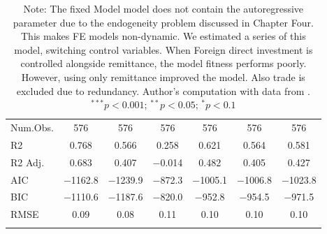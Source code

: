 \begin{longtable}{@{\extracolsep{-3pt}}lcccccc}
Num.Obs. & \num{576} & \num{576} & \num{576} & \num{576} & \num{576} & \num{576}\\
R2 & \num{0.768} & \num{0.566} & \num{0.258} & \num{0.621} & \num{0.564} & \num{0.581}\\
R2 Adj. & \num{0.683} & \num{0.407} & \num{-0.014} & \num{0.482} & \num{0.405} & \num{0.427}\\
AIC & \num{-1162.8} & \num{-1239.9} & \num{-872.3} & \num{-1005.1} & \num{-1006.8} & \num{-1023.8}\\
BIC & \num{-1110.6} & \num{-1187.6} & \num{-820.0} & \num{-952.8} & \num{-954.5} & \num{-971.5}\\
RMSE & \num{0.09} & \num{0.08} & \num{0.11} & \num{0.10} & \num{0.10} & \num{0.10}\\
\hline 
\caption*{\scriptsize{Note: The fixed Model model does not contain the autoregressive parameter due to the endogeneity problem discussed in Chapter Four. This makes FE models non-dynamic. We estimated a series of this model, switching control variables. When Foreign direct investment is controlled alongside remittance, the model fitness performs poorly. However, using only remittance improved the model. Also trade is excluded due to redundancy. Author's computation with data from \textcite{wdi_world_2023, unsdg_sustainable_2023}. $^{***}p<0.001$; $^{**}p<0.05$; $^{*}p<0.1$}}
\label{table:FE_RQ1}
\end{longtable}



